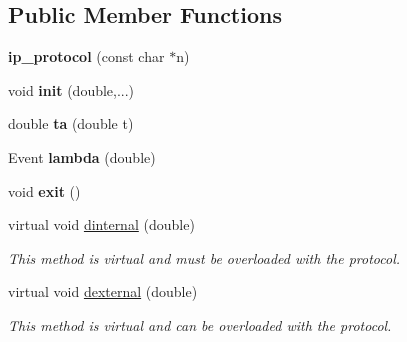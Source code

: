 \subsection*{Public Member Functions}
\begin{DoxyCompactItemize}
\item 
{\bfseries ip\+\_\+protocol} (const char $\ast$n)\hypertarget{classip__protocol_af3d5fa13a4175ab93d431ad38e7c3712}{}\label{classip__protocol_af3d5fa13a4175ab93d431ad38e7c3712}

\item 
void {\bfseries init} (double,...)\hypertarget{classip__protocol_a41b4678b7d525775ca4ed84dd4f8daac}{}\label{classip__protocol_a41b4678b7d525775ca4ed84dd4f8daac}

\item 
double {\bfseries ta} (double t)\hypertarget{classip__protocol_a799af7a028afc688255e9efe732e00f4}{}\label{classip__protocol_a799af7a028afc688255e9efe732e00f4}

\item 
Event {\bfseries lambda} (double)\hypertarget{classip__protocol_ae92e4088780f38a62419a202d53e2511}{}\label{classip__protocol_ae92e4088780f38a62419a202d53e2511}

\item 
void {\bfseries exit} ()\hypertarget{classip__protocol_aed94f19da59b71685e9d17de4febcd75}{}\label{classip__protocol_aed94f19da59b71685e9d17de4febcd75}

\item 
virtual void \hyperlink{classip__protocol_a5c4dd62ee8cffa83a592f29306686be9}{dinternal} (double)
\begin{DoxyCompactList}\small\item\em This method is virtual and must be overloaded with the protocol. \end{DoxyCompactList}\item 
virtual void \hyperlink{classip__protocol_a34e2cc9e802edf0ba1fdbcbcbee92f5b}{dexternal} (double)
\begin{DoxyCompactList}\small\item\em This method is virtual and can be overloaded with the protocol. \end{DoxyCompactList}\end{DoxyCompactItemize}
